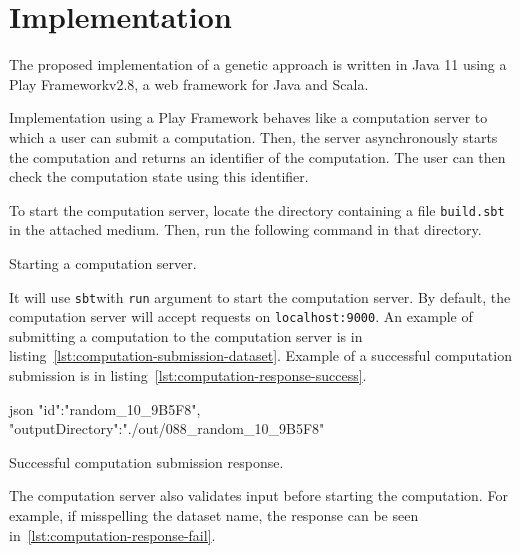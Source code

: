 \newpage


\section{Implementation}\label{sec:implementation}

The proposed implementation of a genetic approach is written in Java 11
using a Play Framework\footnotemark[1] v2.8, a web framework for Java and Scala.

Implementation using a Play Framework behaves like a computation server to which
a user can submit a computation.
Then, the server asynchronously starts the computation and returns an identifier of the computation.
The user can then check the computation state using this identifier.

To start the computation server, locate the directory containing a file \verb|build.sbt| in the attached medium.
Then, run the following command in that directory.

\begin{listing}[h!]
    \caption{Starting a computation server.}
    \label{lst:sbt-run}
\end{listing}

It will use \verb|sbt|\footnotemark[3] with \verb|run| argument to start the computation server.
By default, the computation server will accept requests on \verb|localhost:9000|.
An example of submitting a computation to the computation server is in listing~\ref{lst:computation-submission-dataset}.
Example of a successful computation submission is in listing~\ref{lst:computation-response-success}.

\begin{listing}[h!]
    \begin{cminted}[autogobble,breaklines=true]{json}
    {
      "id":"random_10_9B5F8",
      "outputDirectory":"./out/088_random_10_9B5F8"
    }
    \end{cminted}
    \caption{Successful computation submission response.}
    \label{lst:computation-response-success}
\end{listing}

The computation server also validates input before starting the computation.
For example, if misspelling the dataset name, the response can be seen in~\ref{lst:computation-response-fail}.

